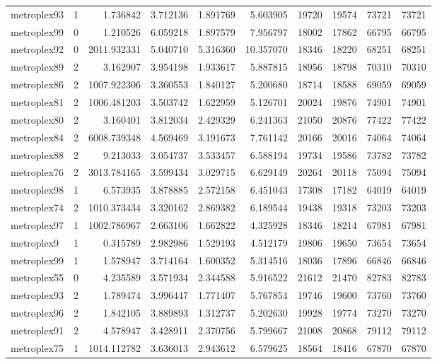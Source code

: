\begin{longtable}{|l|r|r|r|r|r|r|r|r|r|}
metroplex93 & 1 & 1.736842 & 3.712136 & 1.891769 & 5.603905 & 19720 & 19574 & 73721 & 73721 \\
metroplex99 & 0 & 1.210526 & 6.059218 & 1.897579 & 7.956797 & 18002 & 17862 & 66795 & 66795 \\
metroplex92 & 0 & 2011.932331 & 5.040710 & 5.316360 & 10.357070 & 18346 & 18220 & 68251 & 68251 \\
metroplex89 & 2 & 3.162907 & 3.954198 & 1.933617 & 5.887815 & 18956 & 18798 & 70310 & 70310 \\
metroplex86 & 2 & 1007.922306 & 3.360553 & 1.840127 & 5.200680 & 18714 & 18588 & 69059 & 69059 \\
metroplex81 & 2 & 1006.481203 & 3.503742 & 1.622959 & 5.126701 & 20024 & 19876 & 74901 & 74901 \\
metroplex80 & 2 & 3.160401 & 3.812034 & 2.429329 & 6.241363 & 21050 & 20876 & 77422 & 77422 \\
metroplex84 & 2 & 6008.739348 & 4.569469 & 3.191673 & 7.761142 & 20166 & 20016 & 74064 & 74064 \\
metroplex88 & 2 & 9.213033 & 3.054737 & 3.533457 & 6.588194 & 19734 & 19586 & 73782 & 73782 \\
metroplex76 & 2 & 3013.784165 & 3.599434 & 3.029715 & 6.629149 & 20264 & 20118 & 75094 & 75094 \\
metroplex98 & 1 & 6.573935 & 3.878885 & 2.572158 & 6.451043 & 17308 & 17182 & 64019 & 64019 \\
metroplex74 & 2 & 1010.373434 & 3.320162 & 2.869382 & 6.189544 & 19438 & 19318 & 73203 & 73203 \\
metroplex97 & 1 & 1002.786967 & 2.663106 & 1.662822 & 4.325928 & 18346 & 18214 & 67981 & 67981 \\
metroplex9 & 1 & 0.315789 & 2.982986 & 1.529193 & 4.512179 & 19806 & 19650 & 73654 & 73654 \\
metroplex99 & 1 & 1.578947 & 3.714164 & 1.600352 & 5.314516 & 18036 & 17896 & 66846 & 66846 \\
metroplex55 & 0 & 4.235589 & 3.571934 & 2.344588 & 5.916522 & 21612 & 21470 & 82783 & 82783 \\
metroplex93 & 2 & 1.789474 & 3.996447 & 1.771407 & 5.767854 & 19746 & 19600 & 73760 & 73760 \\
metroplex96 & 2 & 1.842105 & 3.889893 & 1.312737 & 5.202630 & 19928 & 19774 & 73270 & 73270 \\
metroplex91 & 2 & 4.578947 & 3.428911 & 2.370756 & 5.799667 & 21008 & 20868 & 79112 & 79112 \\
metroplex75 & 1 & 1014.112782 & 3.636013 & 2.943612 & 6.579625 & 18564 & 18416 & 67870 & 67870 \\

\end{longtable}
